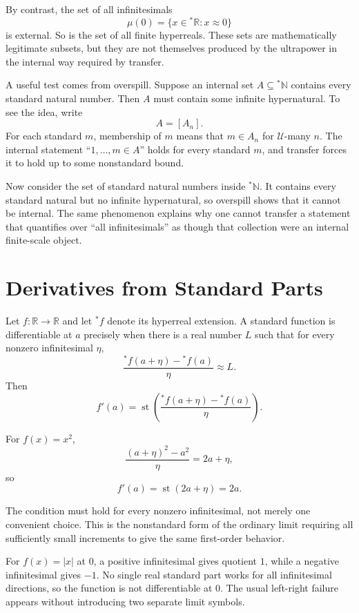 By contrast, the set of all infinitesimals
\[
  \mu(0)=\{x\in{}^*\mathbb R:x\approx0\}
\]
is external.  So is the set of all finite hyperreals.  These sets are mathematically legitimate subsets, but they are not themselves produced by the ultrapower in the internal way required by transfer.

A useful test comes from overspill.  Suppose an internal set \(A\subseteq{}^*\mathbb N\) contains every standard natural number.  Then \(A\) must contain some infinite hypernatural.  To see the idea, write
\[
  A=[A_n].
\]
For each standard \(m\), membership of \(m\) means that \(m\in A_n\) for \(\mathcal U\)-many \(n\).  The internal statement “\(1,\ldots,m\in A\)” holds for every standard \(m\), and transfer forces it to hold up to some nonstandard bound.

Now consider the set of standard natural numbers inside \({}^*\mathbb N\).  It contains every standard natural but no infinite hypernatural, so overspill shows that it cannot be internal.  The same phenomenon explains why one cannot transfer a statement that quantifies over “all infinitesimals” as though that collection were an internal finite-scale object.

\section{Derivatives from Standard Parts}

Let \(f:\mathbb R\to\mathbb R\) and let \({}^*f\) denote its hyperreal extension.  A standard function is differentiable at \(a\) precisely when there is a real number \(L\) such that for every nonzero infinitesimal \(\eta\),
\[
  \frac{{}^*f(a+\eta)-{}^*f(a)}{\eta}\approx L.
\]
Then
\[
  f'(a)=\operatorname{st}\left(
  \frac{{}^*f(a+\eta)-{}^*f(a)}{\eta}
  \right).
\]

For \(f(x)=x^2\),
\[
  \frac{(a+\eta)^2-a^2}{\eta}=2a+\eta,
\]
so
\[
  f'(a)=\operatorname{st}(2a+\eta)=2a.
\]

The condition must hold for every nonzero infinitesimal, not merely one convenient choice.  This is the nonstandard form of the ordinary limit requiring all sufficiently small increments to give the same first-order behavior.

For \(f(x)=|x|\) at \(0\), a positive infinitesimal gives quotient \(1\), while a negative infinitesimal gives \(-1\).  No single real standard part works for all infinitesimal directions, so the function is not differentiable at \(0\).  The usual left-right failure appears without introducing two separate limit symbols.

